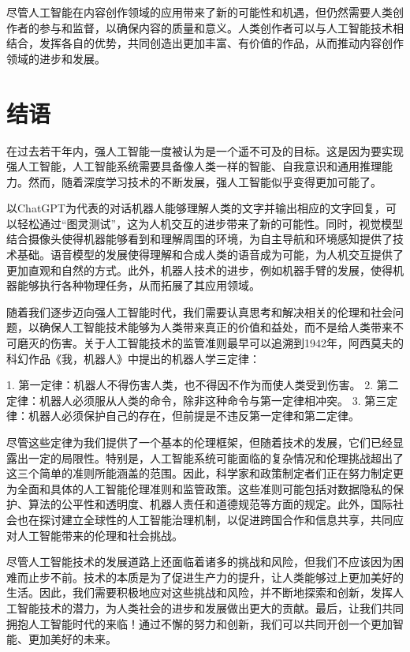 尽管人工智能在内容创作领域的应用带来了新的可能性和机遇，但仍然需要人类创作者的参与和监督，以确保内容的质量和意义。人类创作者可以与人工智能技术相结合，发挥各自的优势，共同创造出更加丰富、有价值的作品，从而推动内容创作领域的进步和发展。

\section{结语}

在过去若干年内，强人工智能一度被认为是一个遥不可及的目标。这是因为要实现强人工智能，人工智能系统需要具备像人类一样的智能、自我意识和通用推理能力。然而，随着深度学习技术的不断发展，强人工智能似乎变得更加可能了。

以ChatGPT为代表的对话机器人能够理解人类的文字并输出相应的文字回复，可以轻松通过“图灵测试”，这为人机交互的进步带来了新的可能性。同时，视觉模型结合摄像头使得机器能够看到和理解周围的环境，为自主导航和环境感知提供了技术基础。语音模型的发展使得理解和合成人类的语音成为可能，为人机交互提供了更加直观和自然的方式。此外，机器人技术的进步，例如机器手臂的发展，使得机器能够执行各种物理任务，从而拓展了其应用领域。

随着我们逐步迈向强人工智能时代，我们需要认真思考和解决相关的伦理和社会问题，以确保人工智能技术能够为人类带来真正的价值和益处，而不是给人类带来不可磨灭的伤害。关于人工智能技术的监管准则最早可以追溯到1942年，阿西莫夫的科幻作品《我，机器人》中提出的机器人学三定律：

1. 第一定律：机器人不得伤害人类，也不得因不作为而使人类受到伤害。
2. 第二定律：机器人必须服从人类的命令，除非这种命令与第一定律相冲突。
3. 第三定律：机器人必须保护自己的存在，但前提是不违反第一定律和第二定律。

尽管这些定律为我们提供了一个基本的伦理框架，但随着技术的发展，它们已经显露出一定的局限性。特别是，人工智能系统可能面临的复杂情况和伦理挑战超出了这三个简单的准则所能涵盖的范围。因此，科学家和政策制定者们正在努力制定更为全面和具体的人工智能伦理准则和监管政策。这些准则可能包括对数据隐私的保护、算法的公平性和透明度、机器人责任和道德规范等方面的规定。此外，国际社会也在探讨建立全球性的人工智能治理机制，以促进跨国合作和信息共享，共同应对人工智能带来的伦理和社会挑战。

尽管人工智能技术的发展道路上还面临着诸多的挑战和风险，但我们不应该因为困难而止步不前。技术的本质是为了促进生产力的提升，让人类能够过上更加美好的生活。因此，我们需要积极地应对这些挑战和风险，并不断地探索和创新，发挥人工智能技术的潜力，为人类社会的进步和发展做出更大的贡献。最后，让我们共同拥抱人工智能时代的来临！通过不懈的努力和创新，我们可以共同开创一个更加智能、更加美好的未来。